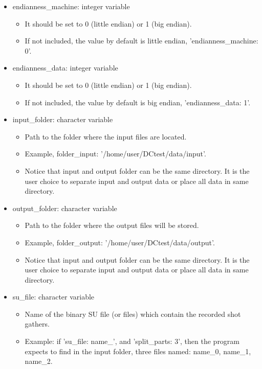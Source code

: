 \documentclass[11pt, oneside]{article}   	%
\begin{document}
\begin{itemize}

 \item endianness\_machine: integer variable
	\begin{itemize}
	\item It should be set to 0 (little endian) or 1 (big endian).
	\item If not included, the value by default is little endian, 'endianness\_machine: 0'.
	\end{itemize}

 \item endianness\_data: integer variable 
	\begin{itemize}
	\item It should be set to 0 (little endian) or 1 (big endian).
	\item If not included, the value by default is big endian, 'endianness\_data: 1'.
	\end{itemize}

\item input\_folder: character variable
	\begin{itemize}
	\item Path to the folder where the input files are located.
	\item Example, folder\_input:  '/home/user/DCtest/data/input'.
	\item Notice that input and output folder can be the same directory. It is the user choice to separate input and output data or place all data in same directory.
	\end{itemize}

\item output\_folder: character variable
	\begin{itemize}
	\item Path to the folder where the output files will be stored.
	\item Example, folder\_{output}:  '/home/user/DCtest/data/output'.
	\item Notice that input and output folder can be the same directory. It is the user choice to separate input and output data or place all data in same directory.
	\end{itemize}
	
\item su\_{file}: character variable 
	\begin{itemize}
	\item Name of the binary SU file (or files) which contain the recorded shot gathers.
	\item Example: if 'su\_file: name\_', and 'split\_parts: 3', then the program expects to find in the input folder, three files named: name\_0, 	name\_1, name\_2.
	\end{itemize}


\end{itemize}
\end{document}

